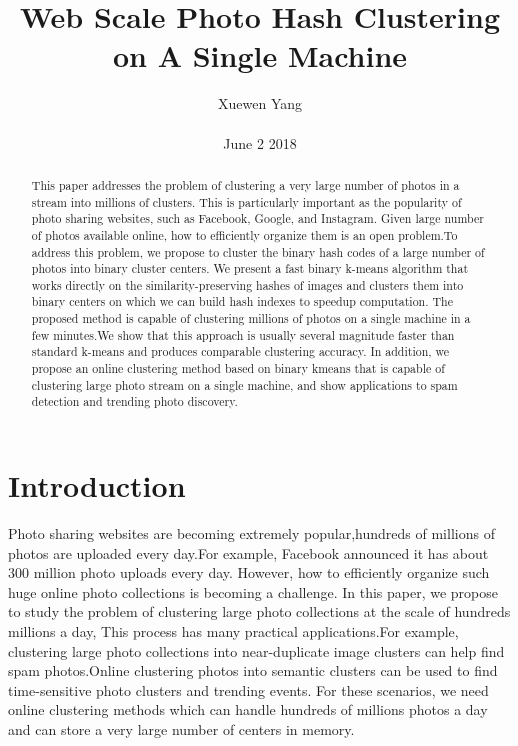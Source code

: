 \documentclass[10pt,twocolumn,letterpaper]{article}
\author{Xuewen Yang\\\\
June 2 2018}
\title{Web Scale Photo Hash Clustering on A Single Machine}
\begin{document}
\maketitle
\begin{abstract}
This paper addresses the problem of clustering a very large number of photos in a stream into millions of clusters. This is particularly important as the popularity of photo sharing websites, such as Facebook, Google, and Instagram. Given large number of photos available online, how to efficiently organize them
is an open problem.To address this problem, we propose to cluster the binary hash codes of a large number of photos into binary cluster centers. We present a fast binary k-means algorithm that works directly on the similarity-preserving hashes of images and clusters them into binary centers on which we can build hash indexes to speedup computation. The proposed method is capable of clustering millions of photos on a single machine in a few minutes.We show that this approach is usually several magnitude faster than standard k-means and produces comparable clustering accuracy. In addition, we propose an online clustering method based on binary kmeans that is capable of clustering large photo stream on a single machine, and show applications to spam detection and trending photo discovery.
\end{abstract}
\section{Introduction}
Photo sharing websites are becoming extremely popular,hundreds of millions of photos are uploaded every day.For example, Facebook announced it has about 300 million photo uploads every day. However, how to efficiently organize such huge online photo collections is becoming a challenge. In this paper, we propose to study the problem of clustering large photo collections at the scale of hundreds millions a day, This process has many practical applications.For example, clustering large photo collections into near-duplicate image clusters can help find spam photos.Online clustering photos into semantic clusters can be used to find time-sensitive photo clusters and trending events. For these scenarios, we need online clustering methods which can handle hundreds of millions photos a day and can store a very large number of centers in memory.
\end{document}
